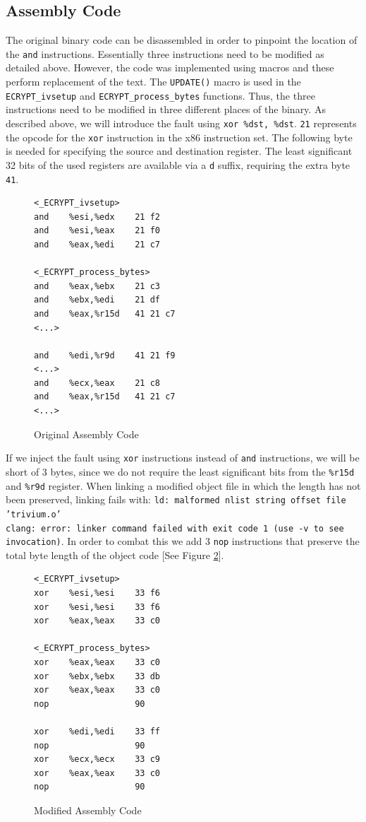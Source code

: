 \documentclass[conference]{IEEEtran}
\newcommand{\code}[1]{\texttt{#1}}
\begin{document}
\subsection{Assembly Code}
The original binary code can be disassembled in order to pinpoint the location of the \code{and} instructions. Essentially three instructions need to be modified as detailed above. However, the code was implemented using macros and these perform replacement of the text. The \code{UPDATE()} macro is used in the \code{ECRYPT\_ivsetup} and \code{ECRYPT\_process\_bytes} functions. Thus, the three instructions need to be modified in three different places of the binary. As described above, we will introduce the fault using \code{xor \%dst, \%dst}. \code{21} represents the opcode for the \code{xor} instruction in the x86 instruction set. The following byte is needed for specifying the source and destination register. The least significant 32 bits of the used registers are available via a \code{d} suffix, requiring the extra byte \code{41}.
\begin{figure}[H]
\begin{lstlisting}[style=asm, frame=tlrb]
<_ECRYPT_ivsetup>
and    %esi,%edx    21 f2
and    %esi,%eax    21 f0
and    %eax,%edi    21 c7

<_ECRYPT_process_bytes>
and    %eax,%ebx    21 c3
and    %ebx,%edi    21 df  
and    %eax,%r15d   41 21 c7
<...>

and    %edi,%r9d    41 21 f9
<...>
and    %ecx,%eax    21 c8
and    %eax,%r15d   41 21 c7
<...>
\end{lstlisting}
\caption{Original Assembly Code}\label{fig:orgi-asm}
\end{figure}

If we inject the fault using \code{xor} instructions instead of \code{and} instructions, we will be short of 3 bytes, since we do not require the least significant bits from the \code{\%r15d} and \code{\%r9d} register. When linking a modified object file in which the length has not been preserved, linking fails with: \code{ld: malformed nlist string offset file 'trivium.o'\\clang: error: linker command failed with exit code 1 (use -v to see invocation)}. In order to combat this we add 3 \code{nop} instructions that preserve the total byte length of the object code [See Figure \ref{fig:mod-asm}].

\begin{figure}[H]
\begin{lstlisting}[style=asm, frame=tlrb]
<_ECRYPT_ivsetup>
xor    %esi,%esi    33 f6
xor    %esi,%esi    33 f6
xor    %eax,%eax    33 c0

<_ECRYPT_process_bytes>
xor    %eax,%eax    33 c0
xor    %ebx,%ebx    33 db 
xor    %eax,%eax    33 c0
nop                 90

xor    %edi,%edi    33 ff
nop                 90
xor    %ecx,%ecx    33 c9
xor    %eax,%eax    33 c0
nop                 90
\end{lstlisting}
\caption{Modified Assembly Code}\label{fig:mod-asm}
\end{figure}
\end{document}
